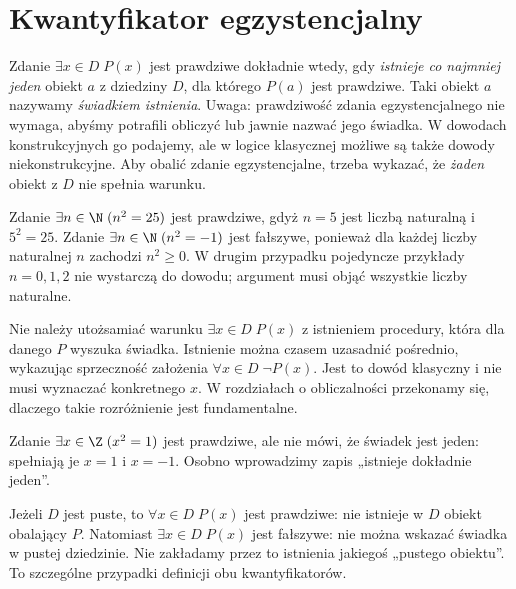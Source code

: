 \section{Kwantyfikator egzystencjalny}\label{sec:exists}
\begin{definicja}[„Istnieje”]\label{def:exists}
Zdanie $\exists x\in D\;P(x)$ jest prawdziwe dokładnie
wtedy, gdy \emph{istnieje co najmniej jeden}
obiekt $a$ z dziedziny $D$, dla którego $P(a)$ jest
prawdziwe. Taki obiekt $a$ nazywamy \emph{świadkiem istnienia}.
Uwaga: prawdziwość zdania egzystencjalnego nie wymaga,
abyśmy potrafili obliczyć lub jawnie nazwać jego świadka.
W dowodach konstrukcyjnych go podajemy, ale w logice
klasycznej możliwe są także dowody niekonstrukcyjne.
Aby obalić zdanie egzystencjalne, trzeba wykazać,
że \emph{żaden} obiekt z $D$ nie spełnia warunku.
\end{definicja}

\begin{przyklad}
Zdanie $\exists n\in\N\;(n^2=25)$ jest prawdziwe,
gdyż $n=5$ jest liczbą naturalną i $5^2=25$.
Zdanie $\exists n\in\N\;(n^2=-1)$ jest fałszywe,
ponieważ dla każdej liczby naturalnej $n$ zachodzi
$n^2\ge0$. W drugim przypadku pojedyncze
przykłady $n=0,1,2$ nie wystarczą do dowodu;
argument musi objąć wszystkie liczby naturalne.
\end{przyklad}

\begin{uwaga}
Nie należy utożsamiać warunku $\exists x\in D\;P(x)$
z istnieniem procedury, która dla danego $P$ wyszuka
świadka. Istnienie można czasem uzasadnić pośrednio,
wykazując sprzeczność założenia $\forall x\in D\;\neg P(x)$.
Jest to dowód klasyczny i nie musi wyznaczać konkretnego
$x$. W rozdziałach o obliczalności przekonamy się, dlaczego
takie rozróżnienie jest fundamentalne.
\end{uwaga}

\begin{przyklad}
Zdanie $\exists x\in\Z\;(x^2=1)$ jest prawdziwe,
ale nie mówi, że świadek jest jeden: spełniają je
$x=1$ i $x=-1$. Osobno wprowadzimy zapis
„istnieje dokładnie jeden”.
\end{przyklad}

\begin{uwaga}
Jeżeli $D$ jest puste, to $\forall x\in D\;P(x)$ jest
prawdziwe: nie istnieje w $D$ obiekt obalający $P$.
Natomiast $\exists x\in D\;P(x)$ jest fałszywe:
nie można wskazać świadka w pustej dziedzinie.
Nie zakładamy przez to istnienia jakiegoś „pustego obiektu”.
To szczególne przypadki definicji obu kwantyfikatorów.
\end{uwaga}

